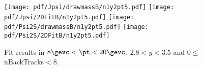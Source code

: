 \begin{figure}[H]
\begin{center}
\texttt{[image: pdf/Jpsi/drawmassB/n1y2pt5.pdf]}
\texttt{[image: pdf/Jpsi/2DFitB/n1y2pt5.pdf]}
\vspace*{-0.5cm}
\texttt{[image: pdf/Psi2S/drawmassB/n1y2pt5.pdf]}
\texttt{[image: pdf/Psi2S/2DFitB/n1y2pt5.pdf]}
\vspace*{-0.5cm}
\end{center}
\caption{Fit results in $8\gevc<\pt<20\gevc$, $2.8<y<3.5$ and 0$\leq$nBackTracks$<$8.}
\label{Fitn1y2pt5}
\end{figure}
